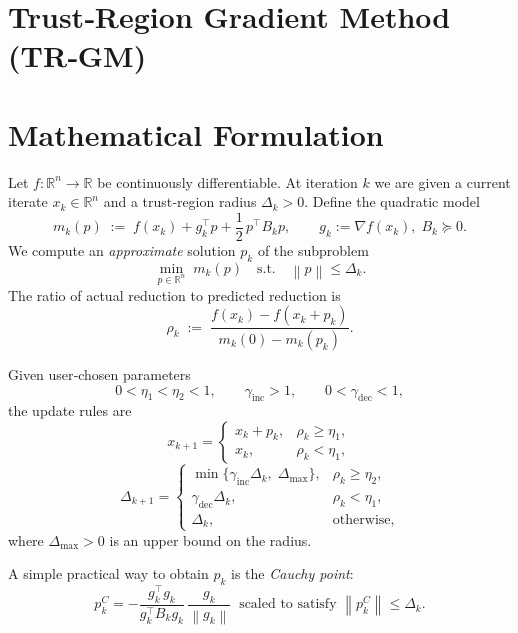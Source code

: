\documentclass[11pt]{article}
\newcommand{\norm}[1]{\left\lVert #1\right\rVert}
\newcommand{\R}{\mathbb{R}}
\begin{document}
\section*{Trust‑Region Gradient Method (TR‑GM)}

\section*{Mathematical Formulation}
Let $f:\R^{n}\rightarrow\R$ be continuously differentiable.  
At iteration $k$ we are given a current iterate $x_{k}\in\R^{n}$ and a
trust‑region radius $\Delta_{k}>0$.
Define the quadratic model
\[
m_{k}(p)\;:=\;f(x_{k})+g_{k}^{\top}p+\frac12\,p^{\top}B_{k}p,
\qquad g_{k}:=\nabla f(x_{k}),\; B_{k}\succeq 0 .
\]
We compute an \emph{approximate} solution $p_{k}$ of the subproblem
\[
\min_{p\in\R^{n}}\; m_{k}(p)\quad\text{s.t.}\quad \norm{p}\le\Delta_{k}.
\tag{TR}
\]
The ratio of actual reduction to predicted reduction is
\[
\rho_{k}\;:=\;
\frac{f(x_{k})-f(x_{k}+p_{k})}{m_{k}(0)-m_{k}(p_{k})}.
\tag{1}
\]

Given user‑chosen parameters
\[
0<\eta_{1}<\eta_{2}<1,\qquad 
\gamma_{\text{inc}}>1,\qquad 
0<\gamma_{\text{dec}}<1,
\tag{2}
\]
the update rules are
\[
x_{k+1}= 
\begin{cases}
x_{k}+p_{k}, & \rho_{k}\ge\eta_{1},\\[4pt]
x_{k}, & \rho_{k}<\eta_{1},
\end{cases}
\tag{3}
\]
\[
\Delta_{k+1}= 
\begin{cases}
\min\{\gamma_{\text{inc}}\Delta_{k},\;\Delta_{\max}\},
& \rho_{k}\ge\eta_{2},\\[4pt]
\gamma_{\text{dec}}\Delta_{k},
& \rho_{k}<\eta_{1},\\[4pt]
\Delta_{k},
& \text{otherwise},
\end{cases}
\tag{4}
\]
where $\Delta_{\max}>0$ is an upper bound on the radius.

A simple practical way to obtain $p_{k}$ is the \emph{Cauchy point}:
\[
p^{C}_{k}= -\frac{g_{k}^{\top}g_{k}}{g_{k}^{\top}B_{k}g_{k}}\,\frac{g_{k}}{\norm{g_{k}}}
\;\;\text{scaled to satisfy }\norm{p^{C}_{k}}\le\Delta_{k}.
\tag{5}
\]
\end{document}
